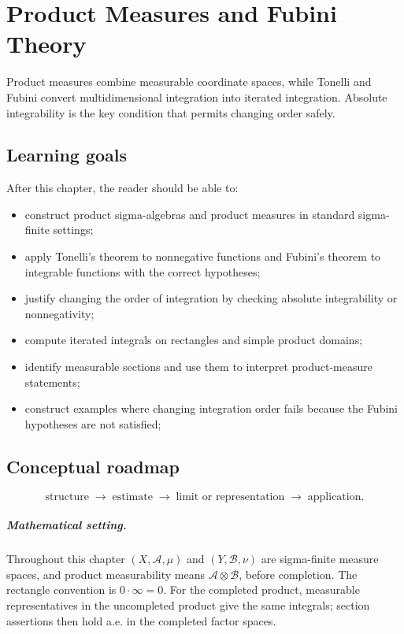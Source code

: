 \chapter{Product Measures and Fubini Theory}
\label{ch:iii05}

Product measures combine measurable coordinate spaces, while Tonelli and Fubini convert multidimensional integration into iterated integration. Absolute integrability is the key condition that permits changing order safely.

\section*{Learning goals}
After this chapter, the reader should be able to:
\begin{itemize}
\item construct product sigma-algebras and product measures in standard sigma-finite settings;
\item apply Tonelli's theorem to nonnegative functions and Fubini's theorem to integrable functions with the correct hypotheses;
\item justify changing the order of integration by checking absolute integrability or nonnegativity;
\item compute iterated integrals on rectangles and simple product domains;
\item identify measurable sections and use them to interpret product-measure statements;
\item construct examples where changing integration order fails because the Fubini hypotheses are not satisfied;
\end{itemize}
\section*{Conceptual roadmap}
\[
\boxed{\text{structure}\;\longrightarrow\;\text{estimate}\;\longrightarrow\;\text{limit or representation}\;\longrightarrow\;\text{application}.}
\]

\paragraph{Mathematical setting.}
Throughout this chapter $(X,\mathcal A,\mu)$ and $(Y,\mathcal B,\nu)$ are sigma-finite measure spaces, and product measurability means $\mathcal A\otimes\mathcal B$, before completion. The rectangle convention is $0\cdot\infty=0$. For the completed product, measurable representatives in the uncompleted product give the same integrals; section assertions then hold a.e. in the completed factor spaces.

